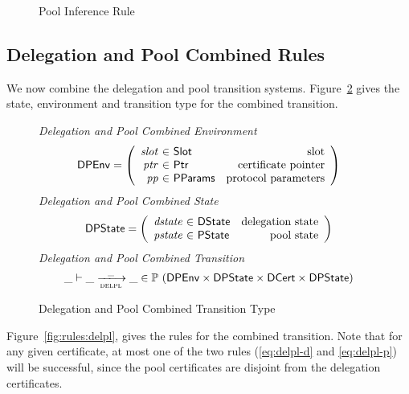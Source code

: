 \begin{figure}[hbt]
  \caption{Pool Inference Rule}
  \label{fig:pool-rules}

\end{figure}

\clearpage

\subsection{Delegation and Pool Combined Rules}
\label{sec:del-pool-rules}

We now combine the delegation and pool transition systems.
Figure~\ref{fig:defs:delpl} gives the state, environment and transition type for the
combined transition.

\begin{figure}[hbt]
  \emph{Delegation and Pool Combined Environment}
  \begin{equation*}
    \DPEnv =
    \left(
      \begin{array}{r@{~\in~}lr}
        \var{slot} & \Slot & \text{slot}\\
        \var{ptr} & \Ptr & \text{certificate pointer}\\
        \var{pp} & \PParams & \text{protocol parameters}\\
      \end{array}
    \right)
  \end{equation*}
  \emph{Delegation and Pool Combined State}
  \begin{equation*}
    \DPState =
    \left(
      \begin{array}{r@{~\in~}lr}
        \var{dstate} & \DState & \text{delegation state}\\
        \var{pstate} & \PState & \text{pool state}\\
      \end{array}
    \right)
  \end{equation*}
  \emph{Delegation and Pool Combined Transition}
  \begin{equation*}
    \_ \vdash \_ \trans{delpl}{\_} \_ \in
      \powerset (
        \DPEnv \times \DPState \times \DCert \times \DPState)
  \end{equation*}
  \caption{Delegation and Pool Combined Transition Type}
  \label{fig:defs:delpl}
\end{figure}

\clearpage

Figure~\ref{fig:rules:delpl}, gives the rules for the combined transition.
Note that for any given certificate, at most one of the two rules
(\cref{eq:delpl-d} and \cref{eq:delpl-p})
will be successful, since the pool certificates are disjoint from the delegation certificates.

